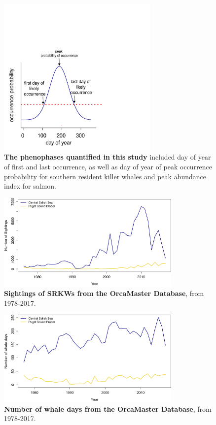 \documentclass{article}
\begin{document}
\begin{figure}[!hp]
\includegraphics[width=0.7\textwidth]{../analyses/figures/phenophases.pdf}
\caption{\textbf{The phenophases quantified in this study} included day of year of first and last occurrence, as well as day of year of peak occurrence probability for southern resident killer whales and peak abundance index for salmon.}
\label{fig:ctcalb}
\end{figure}

\begin{figure}[!hp]
\includegraphics[width=0.8\textwidth]{../analyses/figures/OrcaPhenPlots/numsights_1976_2regs.png} 
\caption{\textbf{Sightings of SRKWs from the OrcaMaster Database}, from 1978-2017. }
\label{fig:sights}
\end{figure}

\begin{figure}[!hp]
\includegraphics[width=0.8\textwidth]{../analyses/figures/OrcaPhenPlots/whaledays_assumeSRKW2regs.png} 
\caption{\textbf{Number of whale days from the OrcaMaster Database}, from 1978-2017. }
\label{fig:wdays}
\end{figure}
\end{document}
